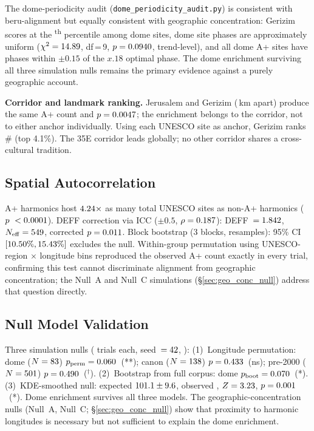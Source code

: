 \documentclass[HARVARD,twocolumn]{USG}
\begin{document}
The dome-periodicity audit (\texttt{dome\_periodicity\_audit.py}) is consistent
with beru-alignment but equally consistent with geographic concentration:
Gerizim scores at the \domeGerizimPctile\textsuperscript{th} percentile
among dome sites, dome site phases are approximately uniform
($\chi^2 = 14.89$, df\,=\,9, $p = 0.0940$, trend-level),
and all \NcircTierAp{} dome A+ sites have phases within
$\pm 0.15$\textdegree{} of the $x.18$\textdegree{} optimal phase.
The dome enrichment surviving all three simulation nulls remains the primary
evidence against a purely geographic account.

\textbf{Corridor and landmark ranking.}
Jerusalem and Gerizim (\GerizimJerusalemKm\,km apart) produce the same
A+ count and $p = 0.0047$; the enrichment belongs to the corridor, not to
either anchor individually. Using each UNESCO site as anchor, Gerizim ranks
\#\GerizimTempleRank{} (top 4.1\%). The 35\textdegree{}E corridor leads
globally; no other corridor shares a cross-cultural tradition.

\subsection{Spatial Autocorrelation}
\label{sec:autocorrelation}

A+ harmonics host $4.24\times$ as many total UNESCO
sites as non-A+ harmonics ($p\ < 0.0001$).
DEFF correction via ICC ($\pm 0.5$\textdegree{}, $\rho = 0.187$):
DEFF~$= 1.842$, $N_\mathrm{eff} = 549$,
corrected $p = 0.011$.
Block bootstrap (3\textdegree{} blocks, \simNperms{} resamples):
95\% CI $[10.50\%, 15.43\%]$ excludes the \NullRateAp{} null.
Within-group permutation using UNESCO-region $\times$ longitude bins
reproduced the observed A+ count exactly in every trial, confirming this
test cannot discriminate alignment from geographic concentration;
the Null~A and Null~C simulations (\S\ref{sec:geo_conc_null})
address that question directly.

\subsection{Null Model Validation}
\label{sec:simulation_null}

Three simulation nulls (\simNperms{} trials each, seed~$= 42{}$,
\citealt{good2005permutation}):
(1)~Longitude permutation: dome ($N = 83$)
$p_\mathrm{perm} = 0.060$~(**);
canon ($N = 138$) $p = 0.433$~(ns);
pre-2000 ($N = 501$) $p = 0.490$~($^\dagger$).
(2)~Bootstrap from full corpus: dome $p_\mathrm{boot} = 0.070$~(*).
(3)~KDE-smoothed null: expected $101.1 \pm 9.6$, observed \Nap{}, $Z = 3.23$,
$p = 0.001$~(*).
Dome enrichment survives all three models.
The geographic-concentration nulls (Null~A, Null~C;
\S\ref{sec:geo_conc_null}) show that proximity to harmonic longitudes
is necessary but not sufficient to explain the dome enrichment.
\end{document}
